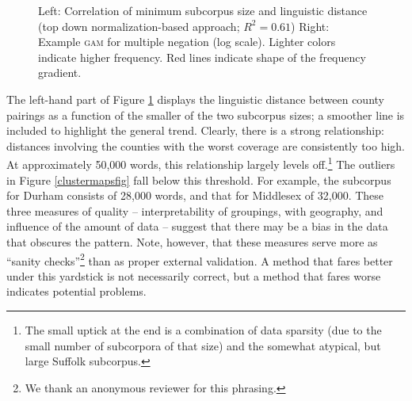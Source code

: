 \documentclass[output=paper]{LSP/langsci}
\begin{document}
\begin{figure}[tbp]
\begin{minipage}[b]{0.45\linewidth}
\end{minipage}
\caption{Left: Correlation of minimum subcorpus size and linguistic distance (top down normalization-based approach; $R^2=0.61$) Right: Example \textsc{gam} for multiple negation (log scale). Lighter colors indicate higher frequency. Red lines indicate shape of the frequency gradient.} \label{fig:wolk:cor-ling}
\end{figure}


The left-hand part of Figure \ref{fig:wolk:cor-ling} displays the linguistic distance between county pairings as a function of the smaller of the two subcorpus sizes; a smoother line is included to highlight the general trend.
Clearly, there is a strong relationship: distances involving the counties with the worst coverage are consistently too high. 
At approximately 50,000 words, this relationship largely levels off.\footnote{The small uptick at the end is a combination of data sparsity (due to the small number of subcorpora of that size) and the somewhat atypical, but large Suffolk subcorpus.}
The outliers in Figure \ref{clustermapsfig} fall below this threshold. For example, the subcorpus for Durham consists of 28,000 words, and that for Middlesex of 32,000.
These three measures of quality -- interpretability of groupings,  with geography, and influence of the amount of data -- suggest that there may be a bias in the data that obscures the pattern.
Note, however, that these measures serve more as ``sanity checks''\footnote{We thank an anonymous reviewer for this phrasing.} than as proper external validation.
A method that fares better under this yardstick is not necessarily correct, but a method that fares worse indicates potential problems.
\end{document}
